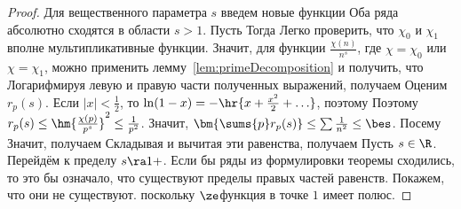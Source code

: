 \documentclass[a4paper]{article}
\begin{document}
\begin{theorem}
\end{theorem}
\begin{proof}
Для вещественного параметра $s$ введем новые функции
Оба ряда абсолютно сходятся в области $s>1$. Пусть
Тогда
Легко проверить, что $\chi_0$ и $\chi_1$\т вполне мультипликативные функции. Значит, для функции
$\frac{\chi(n)}{n^s}$, где $\chi=\chi_0$ или $\chi =\chi_1$, можно применить
лемму~\ref{lem:primeDecomposition} и получить, что
Логарифмируя левую и правую части полученных выражений, получаем
Оценим $r_p(s)$. Если $|x|<\frac12$, то $\ln(1-x)=-\hr{x+\frac{x^2}2+\ldots}$, поэтому
Поэтому $r_p(s)\le\hm{\frac{\chi(p)}{p^s}}^2\le\frac1{p^2}$. Значит, $\bm{\sums{p} r_p(s)}\le\sum\frac1{n^2}\le\bes$. Посему
Значит, получаем
Складывая и вычитая эти равенства, получаем
Пусть $s \in \R$.
Перейдём к пределу $s\ra1+$. Если бы ряды из формулировки теоремы сходились, то это бы означало, что
существуют пределы правых частей равенств. Покажем, что они не существуют.
поскольку $\ze$\д функция в точке $1$ имеет полюс.


\end{proof}
\end{document}

